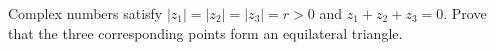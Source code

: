 Complex numbers satisfy $|z_1|=|z_2|=|z_3|=r>0$ and $z_1+z_2+z_3=0$. Prove that the three corresponding points form an equilateral triangle.
